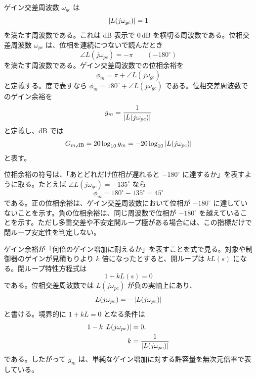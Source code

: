 \begin{definition}[交差周波数と安定余裕]
ゲイン交差周波数 $\omega_{gc}$ は
\begin{equation}
  \left|L(j\omega_{gc})\right|=1
\end{equation}
を満たす周波数である。これは dB 表示で $0\,\mathrm{dB}$ を横切る周波数である。位相交差周波数 $\omega_{pc}$ は、位相を連続につないで読んだとき
\begin{equation}
  \angle L(j\omega_{pc})=-\pi
  \qquad (-180^\circ)
\end{equation}
を満たす周波数である。ゲイン交差周波数での位相余裕を
\begin{equation}
  \phi_m=\pi+\angle L(j\omega_{gc})
\end{equation}
と定義する。度で表すなら $\phi_m=180^\circ+\angle L(j\omega_{gc})$ である。位相交差周波数でのゲイン余裕を
\begin{equation}
  g_m=\frac{1}{\left|L(j\omega_{pc})\right|}
\end{equation}
と定義し、dB では
\begin{equation}
  G_{m,\mathrm{dB}}=20\log_{10}g_m
  =-20\log_{10}\left|L(j\omega_{pc})\right|
\end{equation}
と表す。
\end{definition}

位相余裕の符号は、「あとどれだけ位相が遅れると $-180^\circ$ に達するか」を表すように取る。たとえば $\angle L(j\omega_{gc})=-135^\circ$ なら
\begin{equation}
  \phi_m=180^\circ-135^\circ=45^\circ
\end{equation}
である。正の位相余裕は、ゲイン交差周波数において位相が $-180^\circ$ に達していないことを示す。負の位相余裕は、同じ周波数で位相が $-180^\circ$ を越えていることを示す。ただし多重交差や不安定開ループ極がある場合には、この指標だけで閉ループ安定性を判定しない。

\begin{derivation}
ゲイン余裕が「何倍のゲイン増加に耐えるか」を表すことを式で見る。対象や制御器のゲインが見積もりより $k$ 倍になったとすると、開ループは $kL(s)$ になる。閉ループ特性方程式は
\begin{equation}
  1+kL(s)=0
\end{equation}
である。位相交差周波数では $L(j\omega_{pc})$ が負の実軸上にあり、
\begin{equation}
  L(j\omega_{pc})=-\left|L(j\omega_{pc})\right|
\end{equation}
と書ける。境界的に $1+kL=0$ となる条件は
\begin{align}
  1-k\left|L(j\omega_{pc})\right|&=0,\\
  k&=\frac{1}{\left|L(j\omega_{pc})\right|}
\end{align}
である。したがって $g_m$ は、単純なゲイン増加に対する許容量を無次元倍率で表している。
\end{derivation}

